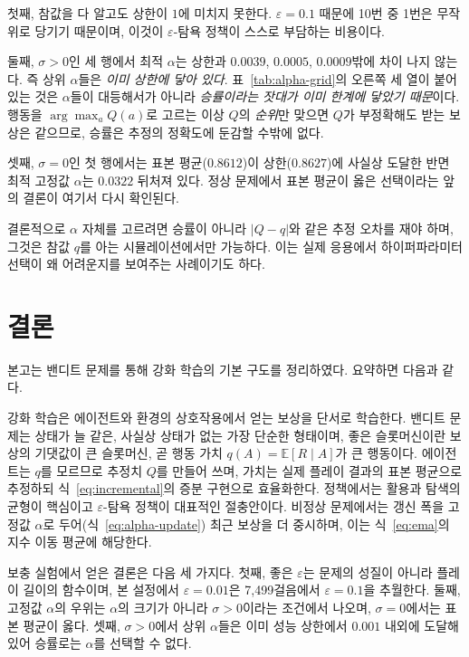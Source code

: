 \documentclass[11pt,a4paper]{article}
\newcommand{\qt}{q}                       %
\newcommand{\Qe}{Q}                       %
\newcommand{\E}{\mathbb{E}}
\newcommand{\eps}{\varepsilon}
\begin{document}
첫째, 참값을 다 알고도 상한이 $1$에 미치지 못한다. $\eps=0.1$ 때문에 10번 중 1번은 무작위로 당기기
때문이며, 이것이 $\eps$-탐욕 정책이 스스로 부담하는 비용이다.

둘째, $\sigma>0$인 세 행에서 최적 $\alpha$는 상한과 $0.0039$, $0.0005$, $0.0009$밖에 차이 나지 않는다.
즉 상위 $\alpha$들은 \emph{이미 상한에 닿아 있다}. 표~\ref{tab:alpha-grid}의 오른쪽 세 열이 붙어 있는
것은 $\alpha$들이 대등해서가 아니라 \emph{승률이라는 잣대가 이미 한계에 닿았기 때문}이다. 행동을 $\arg\max_a \Qe(a)$로 고르는 이상
$\Qe$의 \emph{순위}만 맞으면 $\Qe$가 부정확해도 받는 보상은 같으므로, 승률은 추정의 정확도에 둔감할
수밖에 없다.

셋째, $\sigma=0$인 첫 행에서는 표본 평균($0.8612$)이 상한($0.8627$)에 사실상 도달한 반면 최적 고정값
$\alpha$는 $0.0322$ 뒤처져 있다. 정상 문제에서 표본 평균이 옳은 선택이라는 앞의 결론이 여기서 다시
확인된다.

결론적으로 $\alpha$ 자체를 고르려면 승률이 아니라 $|\Qe - \qt|$와 같은 추정 오차를 재야 하며, 그것은
참값 $\qt$를 아는 시뮬레이션에서만 가능하다. 이는 실제 응용에서 하이퍼파라미터 선택이 왜 어려운지를
보여주는 사례이기도 하다.

\section{결론}

본고는 밴디트 문제를 통해 강화 학습의 기본 구도를 정리하였다. 요약하면 다음과 같다.

강화 학습은 에이전트와 환경의 상호작용에서 얻는 보상을 단서로 학습한다. 밴디트 문제는 상태가 늘
같은, 사실상 상태가 없는 가장 단순한 형태이며, 좋은 슬롯머신이란 보상의 기댓값이 큰 슬롯머신, 곧
행동 가치 $\qt(A)=\E[R\mid A]$가 큰 행동이다. 에이전트는 $\qt$를 모르므로 추정치 $\Qe$를 만들어 쓰며,
가치는 실제 플레이 결과의 표본 평균으로 추정하되 식~\eqref{eq:incremental}의 증분 구현으로 효율화한다.
정책에서는 활용과 탐색의 균형이 핵심이고 $\eps$-탐욕 정책이 대표적인 절충안이다. 비정상 문제에서는
갱신 폭을 고정값 $\alpha$로 두어(식~\eqref{eq:alpha-update}) 최근 보상을 더 중시하며, 이는
식~\eqref{eq:ema}의 지수 이동 평균에 해당한다.

보충 실험에서 얻은 결론은 다음 세 가지다. 첫째, 좋은 $\eps$는 문제의 성질이 아니라 플레이 길이의
함수이며, 본 설정에서 $\eps=0.01$은 7,499걸음에서 $\eps=0.1$을 추월한다. 둘째, 고정값 $\alpha$의
우위는 $\alpha$의 크기가 아니라 $\sigma>0$이라는 조건에서 나오며, $\sigma=0$에서는 표본 평균이 옳다.
셋째, $\sigma>0$에서 상위 $\alpha$들은 이미 성능 상한에서 $0.001$ 내외에 도달해 있어 승률로는 $\alpha$를
선택할 수 없다.
\end{document}
